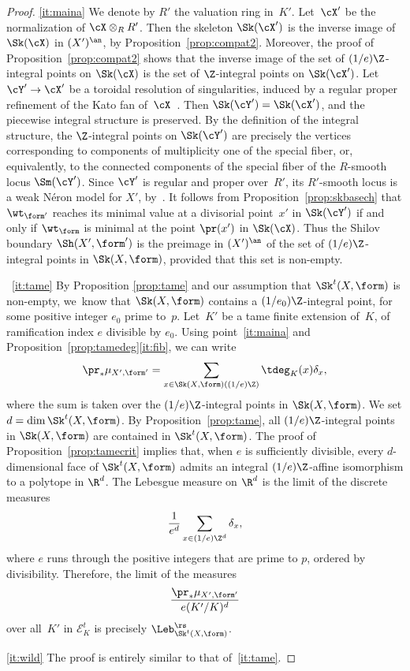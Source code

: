 \skpt
\begin{proof}
\eqref{it:maina} We denote by $R'$ the valuation ring in~$K'$.
Let~$\cX'$ be the normalization of $\cX\otimes_R R'$. Then the skeleton $\Sk(\cX')$ is the inverse image of $\Sk(\cX)$ in $(X')^{\an}$, by Proposition~\ref{prop:compat2}. Moreover, the proof of Proposition~\ref{prop:compat2} shows that the inverse image of the set of $(1/e)\Z$-integral points on $\Sk(\cX)$ is the set of $\Z$-integral points on $\Sk(\cX')$. Let $\cY'\to \cX'$ be a toroidal resolution of singularities, induced by a regular proper refinement of the Kato fan of~$\cX$~\cite[\S10]{kato}.
Then $\Sk(\cY')=\Sk(\cX')$, and the piecewise integral structure is preserved. By the definition of the integral structure, the $\Z$-integral points
on $\Sk(\cY')$ are precisely the vertices corresponding to components of multiplicity one of the special fiber, or, equivalently, to the connected components of
the special fiber of the $R$\nobreakdash-smooth locus $\Sm(\cY')$. Since $\cY'$ is regular and proper over~$R'$, its $R'$-smooth locus is a weak Néron model for $X'$, by~\cite[3.1/2]{BLR}. It follows from Proposition~\ref{prop:skbasech} that $\wt_{\form'}$ reaches its minimal value at a divisorial point~$x'$ in $\Sk(\cY')$ if and only if
$\wt_{\form}$ is minimal at the point $\pr(x')$ in $\Sk(\cX)$. Thus the Shilov boundary $\Sh(X',\form')$ is the preimage in $(X')^{\an}$ of the set of $(1/e)\Z$-integral points in $\Sk(X,\form)$, provided that this set is non-empty.

~\eqref{it:tame}
By Proposition \ref{prop:tame} and our assumption that $\Sk^t(X,\form)$ is non-empty, we~know that $\Sk(X,\form)$ contains a $(1/e_0)\Z$-integral point, for some positive integer $e_0$ prime to~$p$.
Let~$K'$ be a tame finite extension of~$K$, of ramification index $e$ divisible by $e_0$.
Using point~\eqref{it:maina} and Proposition~\ref{prop:tamedeg}\eqref{it:fib}, we can write
\[
\pr_\ast\mu_{X',\form'}=\sum_{x\in \Sk(X,\form)((1/e)\Z)} \tdeg_K(x)\delta_x,
\]
where the sum is taken over the $(1/e)\Z$-integral points in $\Sk(X,\form)$.
We set $d=\dim \Sk^t(X,\form)$.
By Proposition~\ref{prop:tame}, all $(1/e)\Z$-integral points in $\Sk(X,\form)$ are contained in $\Sk^t(X,\form)$.
The proof of Proposition~\ref{prop:tamecrit} implies that,
when $e$ is sufficiently divisible, every
$d$-dimensional face of $\Sk^t(X,\form)$ admits an integral $(1/e)\Z$-affine isomorphism
to a polytope in $\R^d$.
The Lebesgue measure on $\R^d$ is the limit of the discrete measures
\[
\frac{1}{e^d}\sum_{x\in (1/e)\Z^d}\delta_x,
\]
where $e$ runs through the positive integers that are prime to $p$, ordered by divisibility.
Therefore,
the limit of the measures
\[
\frac{\pr_\ast\mu_{X',\form'}}{e(K'/K)^{d}}
\]
over all~$K'$ in $\mathcal{E}^t_K$ is precisely
$\Leb^{\rs}_{\Sk^t(X,\form)}$.

\eqref{it:wild} The proof is entirely similar to that of~\eqref{it:tame}.
\end{proof}

